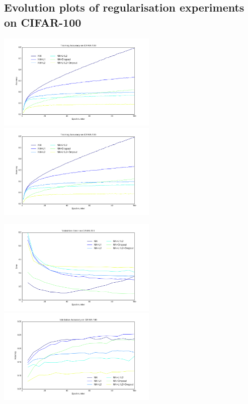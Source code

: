 \documentclass[]{article}
\begin{document}
\subsection{Evolution plots of regularisation experiments on CIFAR-100}
\includegraphics[width=3in]{Regularisation_train_acc_100}
\includegraphics[width=3in]{Regularisation_train_acc_100}

\includegraphics[width=3in]{Regularisation_valid_err_100}
\includegraphics[width=3in]{Regularisation_valid_acc_100}
\end{document}
